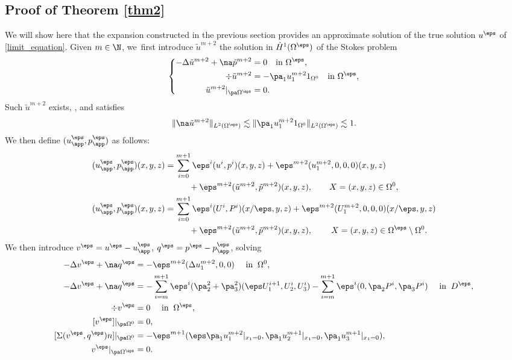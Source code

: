 \subsection{Proof of Theorem \ref{thm2}}
We will show here that the expansion constructed in the previous section provides an approximate solution of the true solution $u^\eps$ of \eqref{limit_equation}. Given $m \in \N$, we~first introduce $\tilde{u}^{m+2}$ the solution in $\dot{H}^1(\Omega^\eps)$ of the Stokes problem
\begin{equation*}
\left\{
\begin{aligned}
-\Delta \tilde{u}^{m+2} + \na \tilde{p}^{m+2} & = 0 \quad \text{in } \Omega^\eps, \\
\div \tilde{u}^{m+2} & = - \pa_1 u^{m+2}_1 1_{\Omega^0} \quad \text{in } \Omega^\eps, \\
\tilde{u}^{m+2}\vert_{\pa \Omega^\eps} & = 0.
\end{aligned}
\right.
\end{equation*}
Such $\tilde{u}^{m+2}$ exists, \cf \cite[Th.\,IV.3.3]{Galdi}, and satisfies
\[
\|\na \tilde{u}^{m+2}\|_{L^2(\Omega^\eps)} \lesssim \|\pa_1 u^{m+2}_1 1_{\Omega^0} \|_{L^2(\Omega^\eps)} \lesssim 1.
\]
We then define $(u^\eps_{\app}, p^{\eps}_{\app})$ as follows:
\begin{equation*}
\begin{aligned}
(u^\eps_{\app},p^\eps_{\app})(x,y,z) & = \sum_{i=0}^{m+1} \eps^i (u^i, p^i)(x,y,z) + \eps^{m+2} (u^{m+2}_1,0,0,0)(x,y,z) \\
& \hspace*{1cm}+ \eps^{m+2} (\tilde{u}^{m+2},\tilde{p}^{m+2})(x,y,z), \qquad X = (x,y,z) \in \Omega^0, \\
(u^\eps_{\app}, p^\eps_{\app})(x,y,z) & = \sum_{i=0}^{m+1} \eps^i (U^i, P^i)(x/\eps,y,z) + \eps^{m+2} (U^{m+2}_1,0,0,0)(x/\eps,y,z) \\
& \hspace*{1cm}+ \eps^{m+2} (\tilde{u}^{m+2},\tilde{p}^{m+2})(x,y,z), \qquad \: X = (x,y,z) \in \Omega^\eps\setminus\Omega^0.
\end{aligned}
\end{equation*}
We then introduce $v^\eps = u^\eps - u^\eps_{\app}$, $q^\eps = p^\eps - p^\eps_{\app}$, solving
\begin{align}
-\Delta v^\eps + \na q^\eps & = - \eps^{m+2} (\Delta u^{m+2}_1,0,0) \quad \text{ in } \: \Omega^0,\notag \\
-\Delta v^\eps + \na q^\eps & = - \sum_{i=m}^{m+1} \eps^i (\pa^2_2 + \pa^2_3) (\eps U^{i+1}_1,U^i_2,U^i_3) - \sum_{i=m}^{m+1} \eps^i (0, \pa_2 P^i, \pa_3 P^i) \quad \text{ in } \: D^\eps, \notag \\
\div v^\eps & = 0 \quad \text{ in } \: \Omega^\eps, \\
[v^\eps]\vert_{\pa \Omega^0} & = 0, \notag\\
[\Sigma(v^\eps,q^\eps)n]\vert_{\pa \Omega^0} & = - \eps^{m+1}(\eps \pa_1 u^{m+2}_1\vert_{x_1=0},\pa_1 u^{m+1}_2\vert_{x_1=0}, \pa_1 u^{m+1}_3\vert_{x_1=0}), \notag \\
v^\eps \vert_{\pa \Omega^\eps} & = 0. \notag
\end{align}
